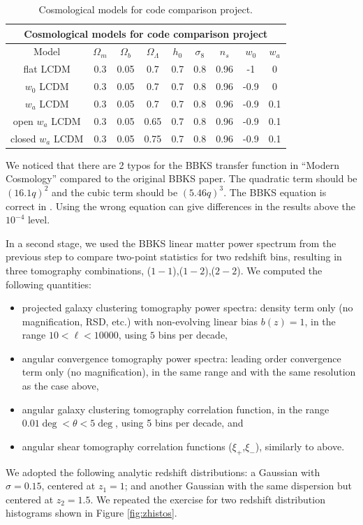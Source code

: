 \documentclass[\docopts]{\docclass}
\begin{document}
\begin{table}[t]
  \centering
  \begin{tabular}{ c | c c c c c c c c }
    \hline
    \multicolumn{9}{|c|}{Cosmological models for code comparison project} \\
    \hline
    \hline
    Model & $\Omega_m$ & $\Omega_b$ & $\Omega_\Lambda$ & $h_0$ & $\sigma_8$ & $n_s$ & $w_0$ & $w_a$ \\
    \hline
    flat LCDM & 0.3 & 0.05 & 0.7 & 0.7 & 0.8 & 0.96 & -1 & 0 \\
    $w_0$ LCDM & 0.3 & 0.05 & 0.7 & 0.7 & 0.8 & 0.96 & -0.9 & 0  \\
    $w_a$ LCDM & 0.3 & 0.05 & 0.7 & 0.7 & 0.8 & 0.96 & -0.9 & 0.1  \\
    open $w_a$ LCDM & 0.3 & 0.05 & 0.65 & 0.7 & 0.8 & 0.96 & -0.9 & 0.1  \\
    closed $w_a$ LCDM & 0.3 & 0.05 & 0.75 & 0.7 & 0.8 & 0.96 & -0.9 & 0.1  \\
    \hline
  \end{tabular}
  \caption{Cosmological models for code comparison project.}
  \label{tab:cosmologies}
\end{table}

We noticed that there are 2 typos for the BBKS transfer function in ``Modern Cosmology'' \citep{DodelsonBook} compared to the original BBKS paper. The quadratic term should be $(16.1q)^2$ and the cubic term should be $(5.46q)^3$. The BBKS equation is correct in \citet{PeacockBook}. Using the wrong equation can give differences in the results above the $10^{-4}$ level.

In a second stage, we used the BBKS linear matter power spectrum from the previous step to compare two-point statistics for two redshift bins, resulting in three tomography combinations, ($1-1$),($1-2$),($2-2$). We computed the following quantities:
\begin{itemize}
\item projected galaxy clustering tomography power spectra: density term only (no magnification, RSD, etc.) with non-evolving linear bias $b(z) = 1$, in the range $10 < \ell < 10000$, using $5$ bins per decade,
\item angular convergence tomography power spectra: leading order convergence term only (no magnification), in the same range and with the same resolution as the case above,
\item angular galaxy clustering tomography correlation function, in the range $0.01 \deg < \theta < 5 \deg$, using 5 bins per decade, and
\item angular shear tomography correlation functions ($\xi_+$,$\xi_-$), similarly to above.
\end{itemize}
We adopted the following analytic redshift distributions: a Gaussian with $\sigma = 0.15$, centered at $z_1 = 1$; and another Gaussian with the same dispersion but centered at $z_2 = 1.5$. We repeated the exercise for two redshift distribution histograms shown in Figure \ref{fig:zhistos}.
\end{document}
